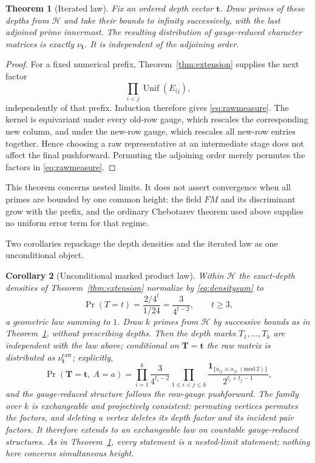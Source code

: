 \documentclass[11pt]{article}
\newtheorem{theorem}{Theorem}[section]
\newtheorem{corollary}[theorem]{Corollary}
\theoremstyle{definition}
\theoremstyle{remark}
\begin{document}
\begin{theorem}[Iterated law]\label{thm:iterated}
Fix an ordered depth vector $\mathbf t$.  Draw primes of these depths from
$\mathcal H$ and take their bounds to infinity successively, with the last
adjoined prime innermost.  The resulting distribution of gauge-reduced
character matrices is exactly $\nu_{\mathbf t}$.  It is independent of the
adjoining order.
\end{theorem}

\begin{proof}
For a fixed numerical prefix, Theorem~\ref{thm:extension} supplies the next
factor
\[
  \prod_{i<j}\operatorname{Unif}(E_{ij}),
\]
independently of that prefix.  Induction therefore gives
\eqref{eq:rawmeasure}.  The kernel is equivariant under every old-row gauge,
which rescales the corresponding new column, and under the new-row gauge,
which rescales all new-row entries together.  Hence choosing a raw
representative at an intermediate stage does not affect the final
pushforward.  Permuting the adjoining order merely permutes the factors in
\eqref{eq:rawmeasure}.
\end{proof}

This theorem concerns nested limits.  It does not assert convergence when
all primes are bounded by one common height: the field $FM$ and its
discriminant grow with the prefix, and the ordinary Chebotarev theorem used
above supplies no uniform error term for that regime.

Two corollaries repackage the depth densities and the iterated law as one
unconditional object.

\begin{corollary}[Unconditional marked product law]\label{cor:product}
Within $\mathcal H$ the exact-depth densities of
Theorem~\ref{thm:extension} normalize by \eqref{eq:densitysum} to
\[
  \Pr(T=t)=\frac{2/4^{t}}{1/24}=\frac{3}{4^{t-2}},\qquad t\ge3,
\]
a geometric law summing to $1$.  Draw $k$ primes from $\mathcal H$ by
successive bounds as in Theorem~\ref{thm:iterated}, without prescribing
depths.  Then the depth marks $T_1,\ldots,T_k$ are independent with the
law above; conditional on $\mathbf T=\mathbf t$ the raw matrix is
distributed as $\nu^{\mathrm{raw}}_{\mathbf t}$; explicitly,
\[
 \Pr(\mathbf T=\mathbf t,\ A=a)
 =\prod_{i=1}^{k}\frac{3}{4^{t_i-2}}
  \prod_{1\le i<j\le k}
  \frac{\mathbf 1_{\{a_{ij}\equiv a_{ji}\ (\mathrm{mod}\ 2)\}}}
       {2^{t_i+t_j-1}},
\]
and the gauge-reduced structure follows the row-gauge pushforward.  The
family over $k$ is exchangeable and projectively consistent: permuting
vertices permutes the factors, and deleting a vertex deletes its depth
factor and its incident pair factors.  It therefore extends to an
exchangeable law on countable gauge-reduced structures.  As in
Theorem~\ref{thm:iterated}, every statement is a nested-limit statement;
nothing here concerns simultaneous height.
\end{corollary}
\end{document}
